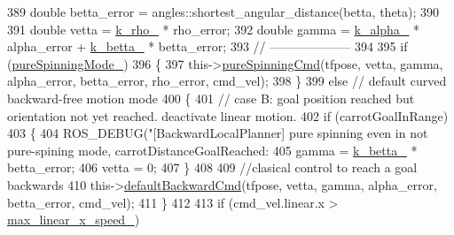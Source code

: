 \begin{DoxyCode}
389                 \textcolor{keywordtype}{double} betta\_error = angles::shortest\_angular\_distance(betta, theta);
390 
391                 \textcolor{keywordtype}{double} vetta = \hyperlink{classcl__move__base__z_1_1backward__local__planner_1_1BackwardLocalPlanner_ad8a36184bfb011545c751109e23d3b98}{k\_rho\_} * rho\_error;
392                 \textcolor{keywordtype}{double} gamma = \hyperlink{classcl__move__base__z_1_1backward__local__planner_1_1BackwardLocalPlanner_abf7a5a56de2ee41afba7e63c0628ec35}{k\_alpha\_} * alpha\_error + \hyperlink{classcl__move__base__z_1_1backward__local__planner_1_1BackwardLocalPlanner_a9f257183d87f1d732cb7e404f09905ad}{k\_betta\_} * betta\_error;
393                 \textcolor{comment}{// --------------------}
394 
395                 \textcolor{keywordflow}{if} (\hyperlink{classcl__move__base__z_1_1backward__local__planner_1_1BackwardLocalPlanner_aebc89ccfa79fdf6bd45ba35134bec3fb}{pureSpinningMode\_})
396                 \{
397                     this->\hyperlink{classcl__move__base__z_1_1backward__local__planner_1_1BackwardLocalPlanner_aaa88a0a47e7cfd449c59518577599928}{pureSpinningCmd}(tfpose, vetta, gamma, alpha\_error, betta\_error, 
      rho\_error, cmd\_vel);
398                 \}
399                 \textcolor{keywordflow}{else} \textcolor{comment}{// default curved backward-free motion mode}
400                 \{
401                     \textcolor{comment}{// case B: goal position reached but orientation not yet reached. deactivate linear
       motion.}
402                     \textcolor{keywordflow}{if} (carrotGoalInRange)
403                     \{
404                         ROS\_DEBUG(\textcolor{stringliteral}{"[BackwardLocalPlanner] pure spinning even in not pure-spining mode,
       carrotDistanceGoalReached: %
405                         gamma = \hyperlink{classcl__move__base__z_1_1backward__local__planner_1_1BackwardLocalPlanner_a9f257183d87f1d732cb7e404f09905ad}{k\_betta\_} * betta\_error;
406                         vetta = 0;
407                     \}
408 
409                     \textcolor{comment}{//clasical control to reach a goal backwards}
410                     this->\hyperlink{classcl__move__base__z_1_1backward__local__planner_1_1BackwardLocalPlanner_a1ebd69a028a22e3573e98f89d593f97d}{defaultBackwardCmd}(tfpose, vetta, gamma, alpha\_error, 
      betta\_error, cmd\_vel);
411                 \}
412 
413                 \textcolor{keywordflow}{if} (cmd\_vel.linear.x > \hyperlink{classcl__move__base__z_1_1backward__local__planner_1_1BackwardLocalPlanner_ae4399072e9ae9cc60d8837860dc4807b}{max\_linear\_x\_speed\_})
}
\end{DoxyCode}
